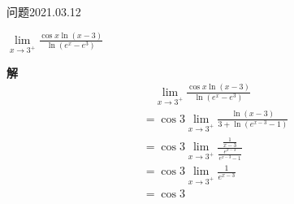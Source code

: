 \begin{mybox}{问题2021.03.12}
	
	\qquad $\lim\limits_{x \to 3^+} \frac{\cos x \ln (x-3)}{\ln(e^x-e^3)}$
\end{mybox}
\noindent
\textbf{解}
\begin{align*}
	&\quad\lim\limits_{x \to 3^+} \frac{\cos x \ln (x-3)}{\ln(e^x-e^3)}\\
	&=\cos3 \lim\limits_{x\to 3^+}\frac{\ln(x-3)}{3+\ln(e^{x-3}-1)}\\
	&=\cos 3 \lim\limits_{x\to 3^+}\frac{\frac{1}{x-3}}{\frac{e^{x-3}}{e^{x-3}-1}}\\
	&=\cos3 \lim\limits_{x \to 3^+} \frac{1}{e^{x-3}}\\
	&=\cos3
\end{align*}